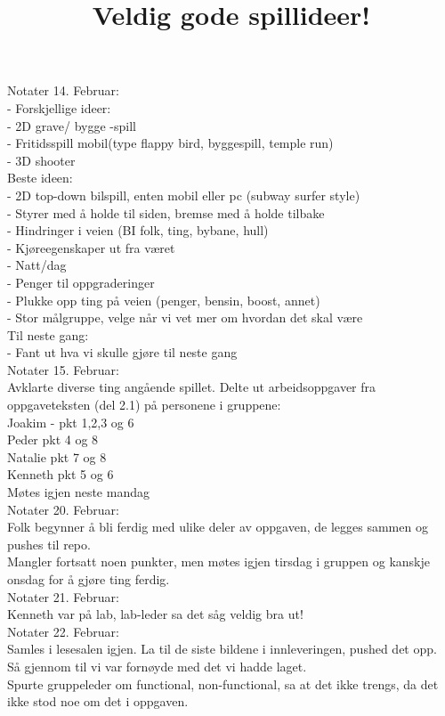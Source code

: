 \documentclass[paper=a4]{article}
\title{Veldig gode spillideer!}
\begin{document}
\maketitle

Notater 14. Februar: \\
- Forskjellige ideer: \\
- 2D grave/ bygge -spill \\
- Fritidsspill mobil(type flappy bird, byggespill, temple run) \\
- 3D shooter \\

Beste ideen: \\
- 2D top-down bilspill, enten mobil eller pc (subway surfer style) \\
- Styrer med å holde til siden, bremse med å holde tilbake \\
- Hindringer i veien (BI folk, ting, bybane, hull) \\
- Kjøreegenskaper ut fra været \\
- Natt/dag \\
- Penger til oppgraderinger \\
- Plukke opp ting på veien (penger, bensin, boost, annet) \\
- Stor målgruppe, velge når vi vet mer om hvordan det skal være \\
Til neste gang: \\
- Fant ut hva vi skulle gjøre til neste gang \\


Notater 15. Februar:  \\
Avklarte diverse ting angående spillet. Delte ut arbeidsoppgaver fra oppgaveteksten (del 2.1) på personene i gruppene: \\
Joakim - pkt 1,2,3 og 6 \\
Peder pkt 4 og 8 \\ 
Natalie pkt 7 og 8 \\
Kenneth pkt 5 og 6 \\

Møtes igjen neste mandag \\

Notater 20. Februar: \\
Folk begynner å bli ferdig med ulike deler av oppgaven, de legges sammen og pushes til repo. \\
Mangler fortsatt noen punkter, men møtes igjen tirsdag i gruppen og kanskje onsdag for å gjøre ting ferdig. \\

Notater 21. Februar: \\
Kenneth var på lab, lab-leder sa det såg veldig bra ut! \\

Notater 22. Februar: \\
Samles i lesesalen igjen. La til de siste bildene i innleveringen, pushed det opp. \\
Så gjennom til vi var fornøyde med det vi hadde laget.  \\
Spurte gruppeleder om functional, non-functional, sa at det ikke trengs, da det ikke stod noe om det i oppgaven.
\end{document}
